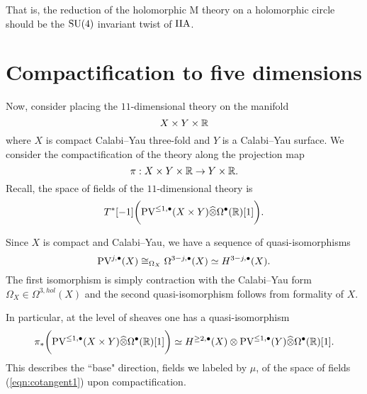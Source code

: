 \documentclass[11pt]{article}
\newcommand{\surya}[1]{(\textcolor{red}{Surya: #1})}
\newcommand\bu{\bullet}
\def\Hat{\widehat}
\begin{document}
That is, the reduction of the holomorphic M theory on a holomorphic circle should be the $\text{SU}(4)$ invariant twist of $\text{IIA}$.



\section{Compactification to five dimensions} 

Now, consider placing the $11$-dimensional theory on the manifold
\[
X \times Y \times \mathbb{R} 
\]
where $X$ is compact Calabi--Yau three-fold and $Y$ is a Calabi--Yau surface.
We consider the compactification of the theory along the projection map 
\[
\pi : X \times Y \times \mathbb{R} \to Y \times \mathbb{R} .
\]
Recall, the space of fields of the $11$-dimensional theory is
\begin{equation}\label{eqn:cotangent1}
T^* [-1] \bigg(\PV^{\leq 1,\bu}(X \times Y) \Hat{\otimes} \Omega^\bu(\mb R) [1] \bigg) .
\end{equation}

Since $X$ is compact and Calabi--Yau, we have a sequence of quasi-isomorphisms 
\[
\PV^{j, \bu}(X) \cong_{\Omega_X} \Omega^{3-j, \bu} (X) \simeq H^{3-j, \bu}(X) .
\]
The first isomorphism is simply contraction with the Calabi--Yau form $\Omega_X \in \Omega^{3,hol}(X)$ and the second quasi-isomorphism follows from formality of $X$. 

In particular, at the level of sheaves one has a quasi-isomorphism
\[
\pi_* \bigg(\PV^{\leq 1,\bu}(X \times Y) \Hat{\otimes} \Omega^\bu(\mb R) [1] \bigg) \simeq H^{\geq 2, \bu}(X) \otimes \PV^{\leq 1, \bu} (Y) \Hat{\otimes} \Omega^\bu (\mb R) [1] .
\]
This describes the ``base" direction, fields we labeled by $\mu$, of the space of fields (\ref{eqn:cotangent1}) upon compactification. 
\end{document}
